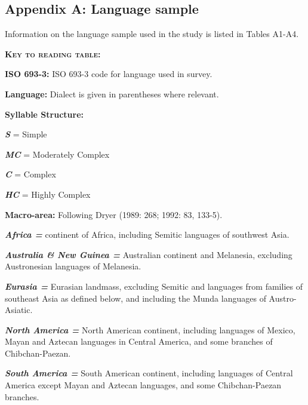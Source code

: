 \subsection{Appendix A: Language sample}

Information on the language sample used in the study is listed in Tables A1-A4.



\textbf{\textsc{Key to reading table:}}



\textbf{ISO 693-3:} ISO 693-3 code for language used in survey.



\textbf{Language:} Dialect is given in parentheses where relevant.



\textbf{Syllable Structure:} 



\textbf{\textit{S} }= Simple 



\textbf{\textit{MC} }= Moderately Complex



\textbf{\textit{C} }= Complex



\textbf{\textit{HC} }= Highly Complex



\textbf{Macro-area:} Following Dryer (1989: 268; 1992: 83, 133-5). 



\textbf{\textit{Africa =}} continent of Africa, including Semitic languages of southwest Asia. 



\textbf{\textit{Australia \& New Guinea =}} Australian continent and Melanesia, excluding Austronesian languages of Melanesia. 



\textbf{\textit{Eurasia =}} Eurasian landmass, excluding Semitic and languages from families of southeast Asia as defined below, and including the Munda languages of Austro-Asiatic. 



\textbf{\textit{North America =} }North American continent, including languages of Mexico, Mayan and Aztecan languages in Central America, and some branches of Chibchan-Paezan. 



\textbf{\textit{South America =}} South American continent, including languages of Central America except Mayan and Aztecan languages, and some Chibchan-Paezan branches. 



